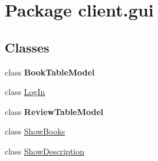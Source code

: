 \hypertarget{namespaceclient_1_1gui}{}\section{Package client.\+gui}
\label{namespaceclient_1_1gui}
\subsection*{Classes}
\begin{DoxyCompactItemize}
\item 
class {\bfseries Book\+Table\+Model}
\item 
class \hyperlink{classclient_1_1gui_1_1_log_in}{Log\+In}
\item 
class {\bfseries Review\+Table\+Model}
\item 
class \hyperlink{classclient_1_1gui_1_1_show_books}{Show\+Books}
\item 
class \hyperlink{classclient_1_1gui_1_1_show_description}{Show\+Description}
\end{DoxyCompactItemize}

